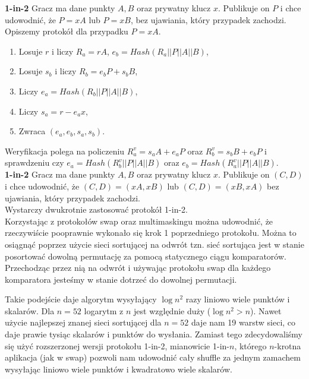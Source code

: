 \documentclass{article}
\begin{document}
\noindent \textbf{1-in-2} Gracz ma dane punkty $A,B$ oraz prywatny klucz $x$. Publikuje on $P$ i chce udowodnić, że $P = xA$ lub $P=xB$, bez ujawiania, który przypadek zachodzi.
\\

\noindent Opiszemy protokół dla przypadku $P = xA$.
\noindent \begin{enumerate}
    \item Losuje $r$ i liczy $R_a = rA$, $e_b = Hash(R_a || P || A || B)$,
    \item Losuje $s_b$ i liczy $R_b = e_bP + s_bB$,
    \item Liczy $e_a = Hash(R_b || P || A || B)$,
    \item Liczy $s_a = r - e_ax$,
    \item Zwraca $(e_a,e_b,s_a,s_b)$.
\end{enumerate}

\noindent Weryfikacja polega na policzeniu $R_a^v = s_aA + e_aP$ oraz $R_b^v = s_bB + e_bP$ i sprawdzeniu czy $e_a = Hash(R_b^v || P || A || B)$ oraz $e_b = Hash(R_a^v || P || A || B)$.
\\

\noindent \textbf{1-in-2} Gracz ma dane punkty $A,B$ oraz prywatny klucz $x$. Publikuje on $(C,D)$ i chce udowodnić, że $(C,D) = (xA,xB)$ lub $(C,D) = (xB,xA)$ bez ujawiania, który przypadek zachodzi.
\\

\noindent Wystarczy dwukrotnie zastosować protokół 1-in-2.
\\


Korzystając z protokołów swap oraz multimaskingu można udowodnić, że rzeczywiście pooprawnie wykonało się krok 1 poprzedniego protokołu. Można to osiągnąć poprzez użycie sieci sortującej na odwrót tzn. sieć sortująca jest w stanie posortować dowolną permutację za pomocą statycznego ciągu komparatorów. Przechodząc przez nią na odwrót i używając protokołu swap dla każdego komparatora jesteśmy w stanie dotrzeć do dowolnej permutacji.


Takie podejście daje algorytm wysyłający $\log{n}^2$ razy liniowo wiele punktów i skalarów. Dla $n = 52$ logarytm z $n$ jest względnie duży ($\log{n}^2 > n$). Nawet użycie najlepszej znanej sieci sortującej dla $n=52$ daje nam 19 warstw sieci, co daje prawie tysiąc skalarów i punktów do wysłania. Zamiast tego zdecydowaliśmy się użyć rozszerzonej wersji protokołu 1-in-2, mianowicie 1-in-$n$, którego $n$-krotna aplikacja (jak w swap) pozwoli nam udowodnić cały shuffle za jednym zamachem wysyłając liniowo wiele punktów i kwadratowo wiele skalarów.
\\
\end{document}
